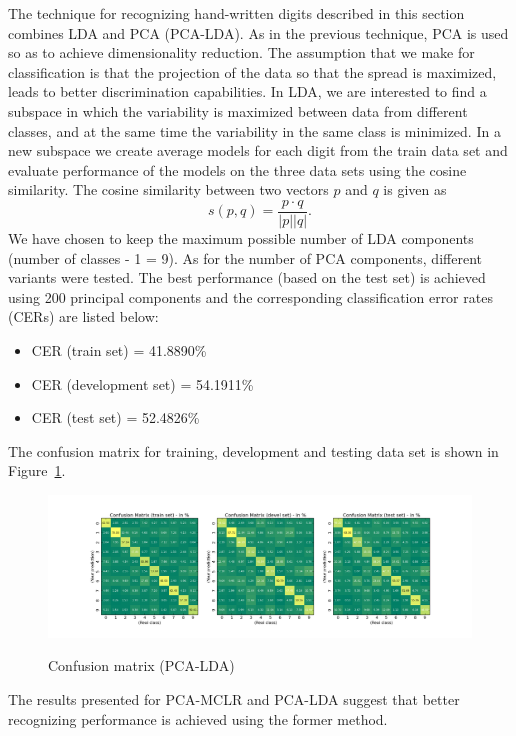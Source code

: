 \documentclass[a4paper,10pt,fleqn]{article}
\begin{document}
The technique for recognizing hand-written digits described in this section combines LDA and PCA (PCA-LDA). As in the previous technique, PCA is used so as to achieve dimensionality reduction.
The assumption that we make for classification is that the projection of the data so that the spread is maximized, leads to  better discrimination capabilities.
In LDA, we are interested to find a subspace in which the variability is maximized between data from
different classes, and at the same time the variability in the same class is minimized. 
In a new subspace we create average models for each digit from the train data set and evaluate performance of the models on the three data sets using the cosine similarity. The cosine similarity between two vectors $p$ and $q$ is given  as
\begin{equation}\label{eq:cs}
s(p,q)=\frac{p\cdot q}{|p||q|}.
\end{equation}
We have chosen to keep the maximum possible number of LDA components (number of classes - 1 = 9).
As for the number of PCA components, different variants were tested. The best performance (based on the test set) is achieved using 200 principal components and the corresponding classification error rates (CERs)  are listed below:
\begin{itemize}
\item CER (train set) = 41.8890\%
\item CER (development set) = 54.1911\%
\item CER (test set) = 52.4826\%
\end{itemize}
The confusion matrix for training, development and testing data set is shown in Figure~\ref{fig:pca_lda}.
\begin{figure}[htbf]
  \caption{Confusion matrix (PCA-LDA)}
  \centering \includegraphics[width=\textwidth,height=0.3\textwidth]{Figures/pca200_lda9}
  \label{fig:pca_lda}
\end{figure}

The results presented for PCA-MCLR and PCA-LDA suggest that better recognizing performance is achieved using the former method.
\end{document}
